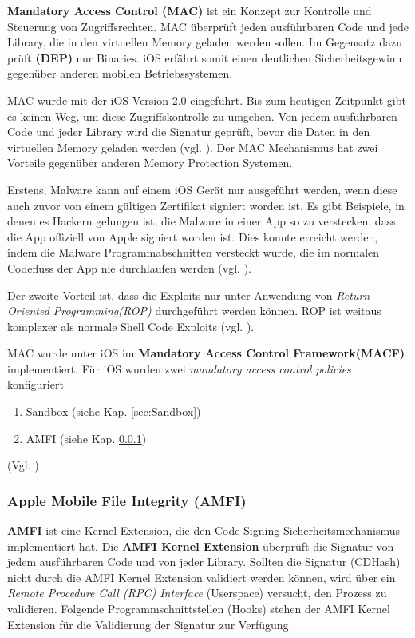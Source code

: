  \textbf{Mandatory Access Control (MAC)} ist ein Konzept zur Kontrolle und Steuerung von Zugriffsrechten. MAC überprüft jeden ausführbaren Code und jede Library, die in den virtuellen Memory geladen werden sollen. Im Gegensatz dazu prüft \textbf{  (DEP)} nur Binaries. iOS erfährt somit einen deutlichen Sicherheitsgewinn gegenüber anderen mobilen Betriebssystemen. \par 
 MAC wurde mit der iOS Version 2.0 eingeführt. Bis zum heutigen Zeitpunkt gibt es keinen Weg, um diese Zugriffskontrolle zu umgehen. Von jedem ausführbaren Code und jeder Library wird die Signatur geprüft, bevor die Daten in den virtuellen Memory geladen werden (vgl. \cite{iOSSec[5], Hacking[1]}).
Der MAC Mechanismus hat zwei Vorteile gegenüber anderen Memory Protection Systemen. \par 
Erstens, Malware kann auf einem iOS Gerät nur ausgeführt werden, wenn diese auch zuvor von einem gültigen Zertifikat signiert worden ist. Es gibt Beispiele, in denen es Hackern gelungen ist, die Malware in einer App so zu verstecken, dass die App offiziell von Apple signiert worden ist. Dies konnte erreicht werden, indem die Malware Programmabschnitten versteckt wurde, die im normalen Codefluss der App nie durchlaufen werden (vgl. \cite{iOSSec[5], Hacking[1]}). \par 

 Der zweite Vorteil ist, dass die Exploits nur unter Anwendung von \textit{ \glqq Return Oriented Programming(ROP)\grqq{} } durchgeführt werden können. ROP ist weitaus komplexer als normale Shell Code Exploits (vgl. \cite{Architecture[1], Architecture[2], Architecture[3], ROP[1], ROP[2], iOSSec[5], Hacking[1]}).

MAC wurde unter iOS im \textbf{Mandatory Access Control Framework(MACF)} implementiert. Für iOS wurden zwei \textit{\glqq mandatory access control policies\grqq{}} konfiguriert
\begin{enumerate}
   \item Sandbox (siehe Kap. \ref{sec:Sandbox})
   \item AMFI (siehe Kap. \ref{sec:AMFI})
\end{enumerate}
(Vgl. \cite{iOSSec[5], Hacking[1]})
\subsubsection{Apple Mobile File Integrity (AMFI)}
\label{sec:AMFI}
\textbf{AMFI } ist eine Kernel Extension, die den Code Signing Sicherheitsmechanismus implementiert hat. Die \textbf{AMFI Kernel Extension} überprüft die Signatur von jedem ausführbaren Code und von jeder Library. Sollten die Signatur (CDHash) nicht durch die AMFI Kernel Extension validiert werden können, wird über ein \textit{\glqq Remote Procedure Call (RPC) Interface\grqq{}} (Userspace) versucht, den Prozess zu validieren. Folgende Programmschnittstellen (Hooks) stehen der AMFI Kernel Extension für die Validierung der Signatur zur Verfügung

